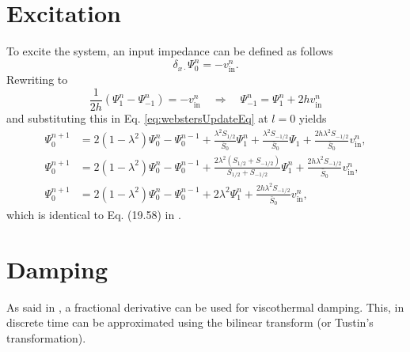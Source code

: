 \documentclass[dvipsnames]{article}
\begin{document}
\section{Excitation}
To excite the system, an input impedance can be defined as follows
\begin{equation}
\delta_{x\cdot}\Psi_0^n = -v_\text{in}^n.
\end{equation} 
Rewriting to
\begin{equation}
    \frac{1}{2h}(\Psi_1^n-\Psi_{-1}^n) = -v_\text{in}^n \quad \Rightarrow \quad \Psi_{-1}^n = \Psi_1^n + 2hv_\text{in}^n
\end{equation}
and substituting this in Eq. \eqref{eq:webstersUpdateEq} at $l=0$ yields
\begin{align}
    \Psi_0^{n+1}&= 2(1-\lambda^2)\Psi_0^n-\Psi_0^{n-1}+ \frac{\lambda^2S_{1/2}}{\bar S_0}\Psi_1^n + \frac{\lambda^2S_{-1/2}}{\bar S_0}\Psi_1 + \frac{2h\lambda^2S_{-1/2}}{\bar S_0}v_\text{in}^n,\nonumber\\
    \Psi_0^{n+1}&= 2(1-\lambda^2)\Psi_0^n-\Psi_0^{n-1}+ \frac{2\lambda^2(S_{1/2}+S_{-1/2})}{S_{1/2}+S_{-1/2}}\Psi_1^n+ \frac{2h\lambda^2S_{-1/2}}{\bar S_0}v_\text{in}^n,\nonumber\\
    \Psi_0^{n+1}&= 2(1-\lambda^2)\Psi_0^n-\Psi_0^{n-1}+ 2\lambda^2\Psi_1^n+ \frac{2h\lambda^2S_{-1/2}}{\bar S_0}v_\text{in}^n,
\end{align}
which is identical to Eq. (19.58) in \cite{Bilbao2018}.
\section{Damping}
As said in \cite{Bilbao2013}, a fractional derivative can be used for viscothermal damping. This, in discrete time can be approximated using the bilinear transform (or Tustin's transformation).
\end{document}
